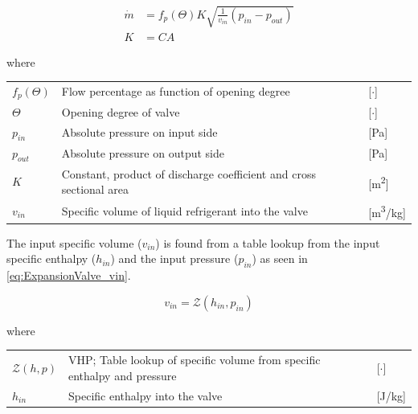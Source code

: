 \begin{equation} \label{eq:ExpansionValve_Alt}
	\begin{split}
		\dot{m} & = f_p(\Theta) K  \sqrt{\frac{1}{v_{in}} (p_{in} - p_{out})} \\
		K       & = C A
	\end{split}
\end{equation}

where

\begin{center}
	\begin{tabular}{l p{10cm} l}
		$f_p(\Theta)$ & Flow percentage as function of opening degree                       & [$\cdot$]          \\
		$ \Theta $    & Opening degree of valve                                             & [$ \cdot $]        \\
		$p_{in}$      & Absolute pressure on input side                                     & [\si{Pa}]          \\
		$p_{out}$     & Absolute pressure on output side                                    & [\si{Pa}]          \\
		$K$           & Constant, product of discharge coefficient and cross sectional area & [\si{m^2}]         \\
		$v_{in}$      & Specific volume of liquid refrigerant into the valve                & [\si{m^3}/\si{kg}]
	\end{tabular}
\end{center}

The input specific volume ($v_{in}$) is found from a table lookup from the input specific enthalpy ($h_{in}$) and the input pressure ($p_{in}$) as seen in \cref{eq:ExpansionValve_vin}.


\begin{equation} \label{eq:ExpansionValve_vin}
	v_{in} = \mathcal{Z}(h_{in}, p_{in})
\end{equation}

where

\begin{center}
	\begin{tabular}{l p{10cm} l}
		$\mathcal{Z}(h, p)$ & VHP; Table lookup of specific volume from specific enthalpy and pressure & [$\cdot$] \\
		$h_{in}$            & Specific enthalpy into the valve                                    & [\si{J}/\si{kg}]
	\end{tabular}
\end{center}

